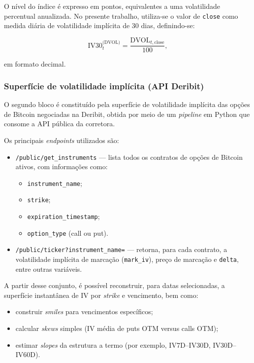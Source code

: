 O nível do índice é expresso em pontos, equivalentes a uma volatilidade percentual
anualizada. No presente trabalho, utiliza-se o valor de \texttt{close} como medida
diária de volatilidade implícita de 30 dias, definindo-se:

\[
\text{IV30}_t^{\text{(DVOL)}} = \frac{\text{DVOL}_{t,\text{close}}}{100},
\]

em formato decimal.

\subsubsection*{Superfície de volatilidade implícita (API Deribit)}

O segundo bloco é constituído pela superfície de volatilidade implícita das opções
de Bitcoin negociadas na Deribit, obtida por meio de um \textit{pipeline} em Python
que consome a API pública da corretora.

Os principais \textit{endpoints} utilizados são:

\begin{itemize}
    \item \texttt{/public/get\_instruments} — lista todos os contratos de opções
    de Bitcoin ativos, com informações como:
    \begin{itemize}
        \item \texttt{instrument\_name};
        \item \texttt{strike};
        \item \texttt{expiration\_timestamp};
        \item \texttt{option\_type} (call ou put).
    \end{itemize}
    \item \texttt{/public/ticker?instrument\_name=} — retorna, para cada
    contrato, a volatilidade implícita de marcação (\texttt{mark\_iv}), preço de
    marcação e \texttt{delta}, entre outras variáveis.
\end{itemize}

A partir desse conjunto, é possível reconstruir, para datas selecionadas, a superfície
instantânea de IV por \textit{strike} e vencimento, bem como:

\begin{itemize}
    \item construir \textit{smiles} para vencimentos específicos;
    \item calcular \textit{skews} simples (IV média de puts OTM versus calls OTM);
    \item estimar \textit{slopes} da estrutura a termo (por exemplo, IV7D–IV30D,
    IV30D–IV60D).
\end{itemize}

